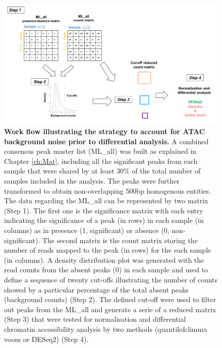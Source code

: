 \begin{landscape}
\begin{figure}[htbp]
\centering
\includegraphics[width=1.2\textwidth]{./Results1/pdfs/ATAC_master_list_filtering_flow_chart}
\caption[Work flow illustrating the strategy to account for ATAC background noise prior to differential analysis.]{\textbf{Work flow illustrating the strategy to account for ATAC background noise prior to differential analysis.} A combined consensus peak master list (ML\_all) was built as explained in Chapter \ref{ch:Mat}, including all the significant peaks from each sample that were shared by at least 30\% of the total number of samples included in the analysis. The peaks were further transformed to obtain non-overlapping 500bp homogenous entities. The data regarding the ML\_all can be represented by two matrix (Step 1). The first one is the significance matrix with each entry indicating the significance of a peak (in rows) in each sample (in columns) as in presence (1, significant) or absence (0, non-significant). The second matrix is the count matrix storing the number of reads mapped to the peak (in rows) for the each sample (in columns). A density distribution plot was generated with the read counts from the absent peaks (0) in each sample and used to define a sequence of twenty cut-offs illustrating the number of counts showed by a particular percentage of the total absent peaks (background counts) (Step 2). The defined cut-off were used to filter out peaks from the ML\_all and generate a serie of a reduced matrix (Step 3) that were tested for normalisation and differential chromatin accessibility analysis by two methods (quantile\&limma voom or DESeq2) (Step 4).}
\label{figure:ML_workflow}
\end{figure}
\end{landscape}



